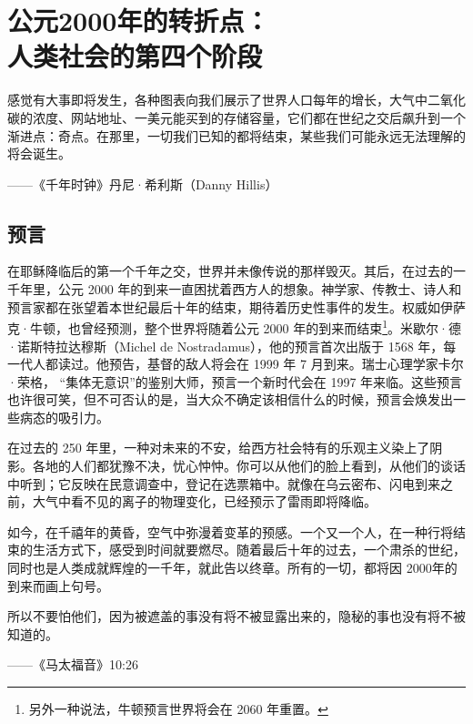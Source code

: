 \chapter[公元2000年的转折点]{公元2000年的转折点：\\ 人类社会的第四个阶段}

\begin{tcolorbox}
\kaishu 感觉有大事即将发生，各种图表向我们展示了世界人口每年的增长，大气中二氧化碳的浓度、网站地址、一美元能买到的存储容量，它们都在世纪之交后飙升到一个渐进点：奇点。在那里，一切我们已知的都将结束，某些我们可能永远无法理解的将会诞生。

\begin{flushright}
——《千年时钟》丹尼·希利斯（Danny Hillis）
\end{flushright}

\end{tcolorbox}


\section{预言}
在耶稣降临后的第一个千年之交，世界并未像传说的那样毁灭。其后，在过去的一千年里，公元 2000 年的到来一直困扰着西方人的想象。神学家、传教士、诗人和预言家都在张望着本世纪最后十年的结束，期待着历史性事件的发生。权威如伊萨克·牛顿，也曾经预测，整个世界将随着公元 2000 年的到来而结束\footnote{另外一种说法，牛顿预言世界将会在 2060 年重置。}。米歇尔·德·诺斯特拉达穆斯（Michel de Nostradamus），他的预言首次出版于 1568 年，每一代人都读过。他预告，基督的敌人将会在 1999 年 7 月到来。瑞士心理学家卡尔·荣格， “集体无意识”的鉴别大师，预言一个新时代会在 1997 年来临。这些预言也许很可笑，但不可否认的是，当大众不确定该相信什么的时候，预言会焕发出一些病态的吸引力。


在过去的 250 年里，一种对未来的不安，给西方社会特有的乐观主义染上了阴影。各地的人们都犹豫不决，忧心忡忡。你可以从他们的脸上看到，从他们的谈话中听到；它反映在民意调查中，登记在选票箱中。就像在乌云密布、闪电到来之前，大气中看不见的离子的物理变化，已经预示了雷雨即将降临。

如今，在千禧年的黄昏，空气中弥漫着变革的预感。一个又一个人，在一种行将结束的生活方式下，感受到时间就要燃尽。随着最后十年的过去，一个肃杀的世纪，同时也是人类成就辉煌的一千年，就此告以终章。所有的一切，都将因 2000年的到来而画上句号。



\begin{tcolorbox}
\kaishu 所以不要怕他们，因为被遮盖的事没有将不被显露出来的，隐秘的事也没有将不被知道的。
\begin{flushright}
——《马太福音》10:26
\end{flushright}
\end{tcolorbox}

